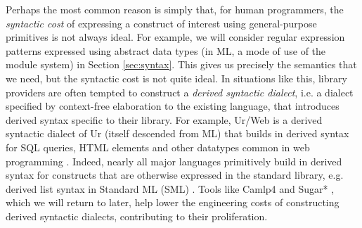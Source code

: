 
Perhaps the most common reason is simply that, for human {programmers}, the \emph{syntactic cost} of expressing a construct of interest using general-purpose primitives is not always ideal. %
For example,  we will consider regular expression patterns expressed using abstract data types (in ML, a mode of use of the module system) in Section \ref{sec:syntax}. This gives us precisely the semantics that we need, but the syntactic cost  is not quite ideal. In situations like this, library providers are often tempted to construct a \emph{derived syntactic dialect}, i.e. a dialect specified by context-free elaboration to the existing language, that introduces derived syntax specific to their library. For example, Ur/Web is a derived syntactic dialect of Ur (itself descended from ML) that builds in derived syntax for SQL queries, HTML elements and other datatypes common in web programming \cite{conf/popl/Chlipala15}. Indeed, nearly all major languages primitively build in derived syntax for constructs that are otherwise expressed in the standard library, e.g. derived list syntax in Standard ML (SML) \cite{harper1997programming,mthm97-for-dart}. Tools like Camlp4 \cite{ocaml-manual} and Sugar* \cite{erdweg2011sugarj,erdweg2013framework}, which we will return to later, help lower the engineering costs of constructing derived syntactic dialects, contributing to their proliferation.%


